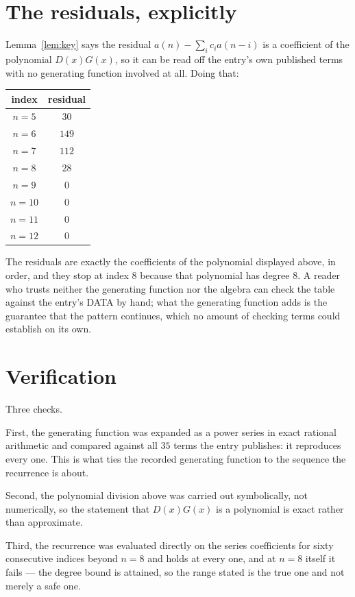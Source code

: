 \documentclass[11pt,a4paper]{article}
\theoremstyle{plain}
\theoremstyle{definition}
\begin{document}
\section{The residuals, explicitly}

Lemma~\ref{lem:key} says the residual $a(n)-\sum_ic_ia(n-i)$ is a coefficient of the
polynomial $D(x)G(x)$, so it can be read off the entry's own published terms with no
generating function involved at all. Doing that:
\begin{center}
\begin{tabular}{cc}
index & residual \\ \hline
$n=5$ & $30$ \\
$n=6$ & $149$ \\
$n=7$ & $112$ \\
$n=8$ & $28$ \\
$n=9$ & $0$ \\
$n=10$ & $0$ \\
$n=11$ & $0$ \\
$n=12$ & $0$
\end{tabular}
\end{center}
The residuals are exactly the coefficients of the polynomial displayed above, in order, and
they stop at index $8$ because that polynomial has degree $8$. A reader who trusts
neither the generating function nor the algebra can check the table against the entry's DATA
by hand; what the generating function adds is the guarantee that the pattern continues, which
no amount of checking terms could establish on its own.

\section{Verification}

Three checks.

First, the generating function was expanded as a power series in exact rational arithmetic and
compared against all $35$ terms the entry publishes: it reproduces every one. This is
what ties the recorded generating function to the sequence the recurrence is about.

Second, the polynomial division above was carried out symbolically, not numerically, so the
statement that $D(x)G(x)$ is a polynomial is exact rather than approximate.

Third, the recurrence was evaluated directly on the series coefficients for sixty consecutive
indices beyond $n=8$ and holds at every one, and at $n=8$ itself it fails --- the
degree bound is attained, so the range stated is the true one and not merely a safe one.
\end{document}
